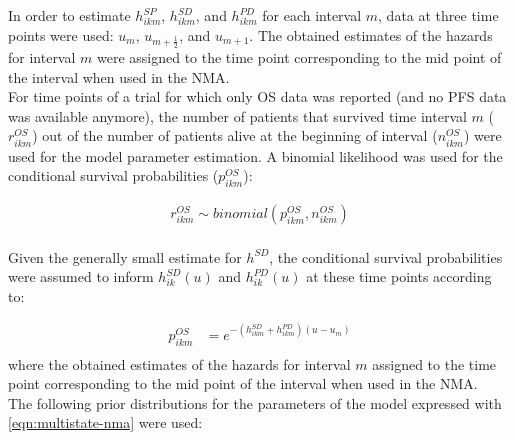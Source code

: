 \documentclass[11pt,final,fleqn]{article}\usepackage[]{graphicx}\usepackage[]{color}
\theoremstyle{plain}
\newcounter{subsubsubsection}[subsubsection]
\begin{document}
{In order to estimate $h_{ikm}^{SP}$, $h_{ikm}^{SD}$, and $h_{ikm}^{PD}$ for each interval $m$,  data at three time points were used: $u_{m}$, $u_{m+\frac{1}{2}}$, and $u_{m+1}$. The obtained estimates of the hazards for interval $m$ were assigned to the time point corresponding to the mid point of the interval when used in the NMA.
\\

For time points of a trial for which only OS data was reported (and no PFS data was available anymore), the number of patients that survived time interval $m$ ($r_{ikm}^{OS}$) out of the number of patients alive at the beginning of interval ($n_{ikm}^{OS}$) were used for the model parameter estimation. A binomial likelihood was used for the conditional survival probabilities ($p_{ikm}^{OS}$):


\begin{equation} \label{eqn:binomial_likelihood}
\begin{aligned}
r_{ikm}^{OS} \sim binomial(p_{ikm}^{OS},n_{ikm}^{OS})
\end{aligned}
\end{equation}
\\
Given the generally small estimate for $h^{SD}$, the conditional survival probabilities were assumed to inform $h_{ik}^{SD}(u)$ and $h_{ik}^{PD}(u)$ at these time points according to:

\begin{equation} \label{eqn:diff_equations_OS}
\begin{aligned}
p_{ikm}^{OS} &= e^{-(h_{ikm}^{SD}+h_{ikm}^{PD})(u-u_{m})} \\
\end{aligned}
\end{equation}
where the obtained estimates of the hazards for interval $m$ assigned to the time point corresponding to the mid point of the interval when used in the NMA.
\\

The following prior distributions for the parameters of the model expressed with \autoref{eqn:multistate-nma} were used:

}
\end{document}
